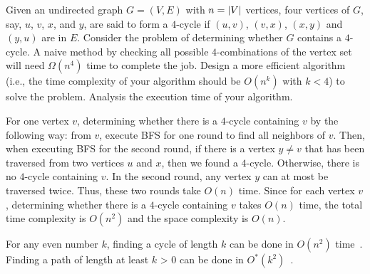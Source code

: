 \begin{Exercise}[origin={NCU CSIE 95}]
Given an undirected graph $G = (V, E)$ with $n = \lvert V\rvert$ vertices, four vertices of $G$, say, $u$, $v$, $x$, and $y$, are said to form a $4$-cycle if $(u, v)$, $(v, x)$, $(x, y)$ and $(y, u)$ are in $E$. Consider the problem of determining whether $G$ contains a $4$-cycle. A naive method by checking all possible $4$-combinations of the vertex set will need $\Omega(n^4)$ time to complete the job. Design a more efficient algorithm (i.e., the time complexity of your algorithm should be $O(n^k)$ with $k < 4$) to solve the problem. Analysis the execution time of your algorithm.
\end{Exercise}
\begin{Answer}
For one vertex $v$, determining whether there is a $4$-cycle containing $v$ by the following way: from $v$, execute BFS for one round to find all neighbors of $v$. Then, when executing BFS for the second round, if there is a vertex $y \neq v$ that has been traversed from two vertices $u$ and $x$, then we found a $4$-cycle. Otherwise, there is no $4$-cycle containing $v$. In the second round, any vertex $y$ can at most be traversed twice. Thus, these two rounds take $O(n)$ time. Since for each vertex $v$, determining whether there is a $4$-cycle containing $v$ takes $O(n)$ time, the total time complexity is $O(n^2)$ and the space complexity is $O(n)$.
\begin{remark}
For any even number $k$, finding a cycle of length $k$ can be done in $O(n^2)$ time~\cite{Yuster1997}. Finding a path of length at least $k$ > 0 can be done in $O^*(k^2)$~\cite{RWilliams2009}.
\end{remark}
\end{Answer}

